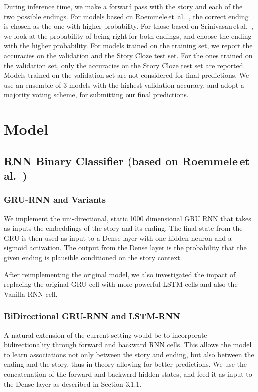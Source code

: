 \documentclass{article}
\begin{document}
During inference time, we make a forward pass with the story and each of the two possible endings. For models based on Roemmele\,et\ al.\ \citep{Roemmele2017AnTest}, the correct ending is chosen as the one with higher probability. For those based on Srinivasan\,et\,al.\ \citep{Srinivasan2018ATest}, we look at the probability of being right for both endings, and choose the ending with the higher probability. For models trained on the training set, we report the accuracies on the validation and the Story Cloze test set. For the  ones trained on the validation set, only the accuracies on the Story Cloze test set are reported. Models trained on the validation set are not considered for final predictions. We use an ensemble of 3 models with the highest validation accuracy, and adopt a majority voting scheme, for submitting our final predictions.

\section{Model}
\subsection{RNN Binary Classifier (based on Roemmele\,et\,al.\ \citep{Roemmele2017AnTest})}

\subsubsection{GRU-RNN and Variants}
We implement the uni-directional, static 1000 dimensional GRU RNN that takes as inputs the embeddings of the story and its ending. The final state from the GRU is then used as input to a Dense layer with one hidden neuron and a sigmoid activation. The output from the Dense layer is the probability that the given ending is plausible conditioned on the story context.

After reimplementing the original model, we also investigated the impact of replacing the original GRU cell with more powerful LSTM cells and also the Vanilla RNN cell.

\subsubsection{BiDirectional GRU-RNN and LSTM-RNN}
A natural extension of the current setting would be to incorporate bidirectionality through forward and backward RNN cells. This allows the model to learn associations not only between the story and ending, but also between the ending and the story, thus in theory allowing for better predictions. We use the concatenation of the forward and backward hidden states, and feed it as input to the Dense layer as described in Section 3.1.1.
\end{document}
